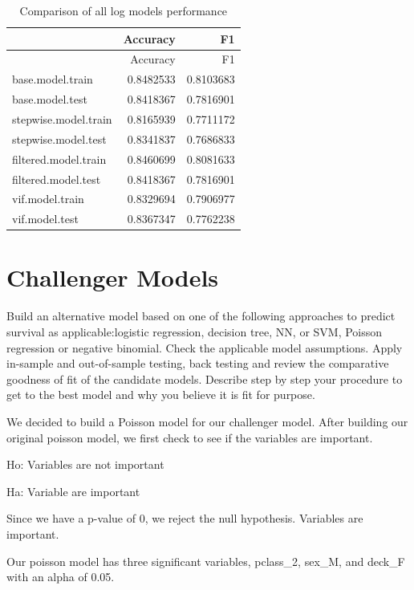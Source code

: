 \documentclass[
  letterpaper,
  DIV=11,
  numbers=noendperiod]{scrartcl}
\begin{document}
\begin{longtable}[]{@{}lrr@{}}
\caption{Comparison of all log models performance}\tabularnewline
\toprule\noalign{}
& Accuracy & F1 \\
\midrule\noalign{}
\endfirsthead
\toprule\noalign{}
& Accuracy & F1 \\
\midrule\noalign{}
\endhead
\bottomrule\noalign{}
\endlastfoot
base.model.train & 0.8482533 & 0.8103683 \\
base.model.test & 0.8418367 & 0.7816901 \\
stepwise.model.train & 0.8165939 & 0.7711172 \\
stepwise.model.test & 0.8341837 & 0.7686833 \\
filtered.model.train & 0.8460699 & 0.8081633 \\
filtered.model.test & 0.8418367 & 0.7816901 \\
vif.model.train & 0.8329694 & 0.7906977 \\
vif.model.test & 0.8367347 & 0.7762238 \\
\end{longtable}

\section{Challenger Models}\label{challenger-models}

Build an alternative model based on one of the following approaches to
predict survival as applicable:logistic regression, decision tree, NN,
or SVM, Poisson regression or negative binomial. Check the applicable
model assumptions. Apply in-sample and out-of-sample testing, back
testing and review the comparative goodness of fit of the candidate
models. Describe step by step your procedure to get to the best model
and why you believe it is fit for purpose.

We decided to build a Poisson model for our challenger model. After
building our original poisson model, we first check to see if the
variables are important.

\par

Ho: Variables are not important

\par

Ha: Variable are important

Since we have a p-value of 0, we reject the null hypothesis. Variables
are important.

Our poisson model has three significant variables, pclass\_2, sex\_M,
and deck\_F with an alpha of 0.05.
\end{document}
